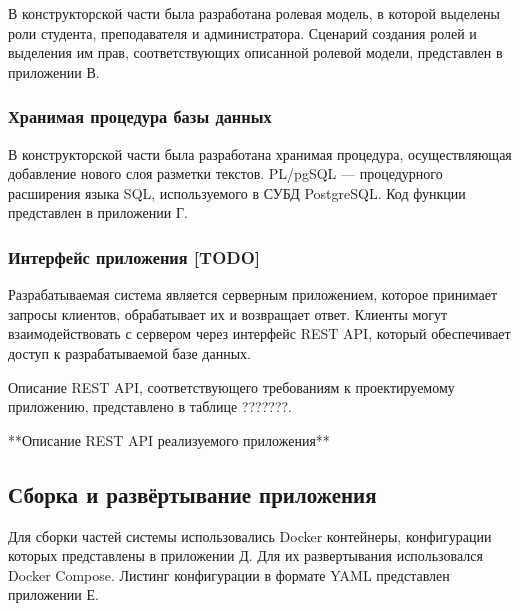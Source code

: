 
В конструкторской части была разработана ролевая модель, в которой выделены роли студента, преподавателя и администратора. Сценарий создания ролей и выделения им прав, соответствующих описанной ролевой модели, представлен в приложении В.


\subsubsection{Хранимая процедура базы данных}


В конструкторской части была разработана хранимая процедура, осуществляющая добавление нового слоя разметки текстов. PL/pgSQL \cite{plpgsql} --- процедурного расширения языка SQL, используемого в СУБД PostgreSQL. Код функции представлен в приложении Г.

\subsubsection{Интерфейс приложения [TODO]}


Разрабатываемая система является серверным приложением, которое принимает запросы клиентов, обрабатывает их и возвращает ответ. Клиенты могут взаимодействовать с сервером через интерфейс REST API, который обеспечивает доступ к разрабатываемой базе данных. 


Описание REST API, соответствующего требованиям к проектируемому приложению, представлено в таблице ???????.

**Описание REST API реализуемого приложения**

\subsection{Сборка и развёртывание приложения}


Для сборки частей системы использовались Docker контейнеры, конфигурации которых представлены в приложении Д. Для их развертывания использовался Docker Compose. Листинг конфигурации в формате YAML представлен приложении Е.


